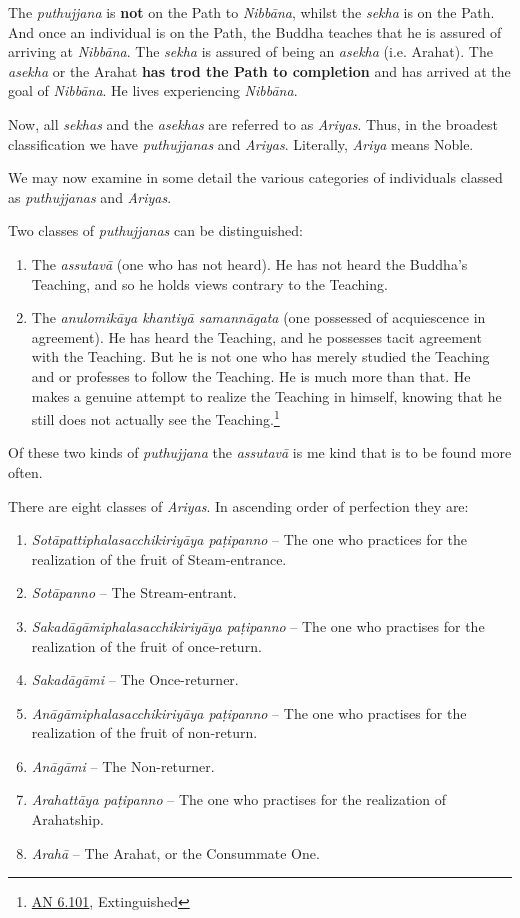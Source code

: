 The \emph{puthujjana} is \textbf{not} on the Path to \emph{Nibbāna}, whilst the \emph{sekha} is on the Path. And once an individual is on the Path, the Buddha teaches that he is assured of arriving at \emph{Nibbāna}. The \emph{sekha} is assured of being an \emph{asekha} (i.e. Arahat). The \emph{asekha} or the Arahat \textbf{has trod the Path to completion} and has arrived at the goal of \emph{Nibbāna}. He lives experiencing \emph{Nibbāna}.

Now, all \emph{sekhas} and the \emph{asekhas} are referred to as \emph{Ariyas}. Thus, in the broadest classification we have \emph{puthujjanas} and \emph{Ariyas}. Literally, \emph{Ariya} means Noble.

We may now examine in some detail the various categories of individuals classed as \emph{puthujjanas} and \emph{Ariyas}.

Two classes of \emph{puthujjanas} can be distinguished:

\begin{enumerate}
\def\labelenumi{\arabic{enumi}.}
\item
  The \emph{assutavā} (one who has not heard). He has not heard the Buddha's Teaching, and so he holds views contrary to the Teaching.
\item
  The \emph{anulomikāya khantiyā samannāgata} (one possessed of acquiescence in agreement). He has heard the Teaching, and he possesses tacit agreement with the Teaching. But he is not one who has merely studied the Teaching and or professes to follow the Teaching. He is much more than that. He makes a genuine attempt to realize the Teaching in himself, knowing that he still does not actually see the Teaching.\footnote{\href{https://suttacentral.net/an6.101/en/sujato}{AN 6.101}, Extinguished}
\end{enumerate}

Of these two kinds of \emph{puthujjana} the \emph{assutavā} is me kind that is to be found more often.

There are eight classes of \emph{Ariyas}. In ascending order of perfection they are:

\begin{enumerate}
\def\labelenumi{\arabic{enumi}.}
\item
  \emph{Sotāpattiphalasacchikiriyāya paṭipanno} -- The one who practices for the realization of the fruit of Steam-entrance.
\item
  \emph{Sotāpanno} -- The Stream-entrant.
\item
  \emph{Sakadāgāmiphalasacchikiriyāya paṭipanno} -- The one who practises for the realization of the fruit of once-return.
\item
  \emph{Sakadāgāmi} -- The Once-returner.
\item
  \emph{Anāgāmiphalasacchikiriyāya paṭipanno} -- The one who practises for the realization of the fruit of non-return.
\item
  \emph{Anāgāmi} -- The Non-returner.
\item
  \emph{Arahattāya paṭipanno} -- The one who practises for the realization of Arahatship.
\item
  \emph{Arahā} -- The Arahat, or the Consummate One.
\end{enumerate}

